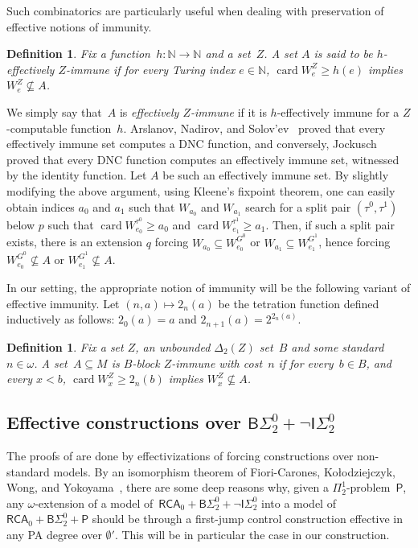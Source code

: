 \documentclass{article}
\newcommand{\Psf}{\mathsf{P}}
\newcommand{\ISig}{\mathsf{I}\Sigma^0}
\newcommand{\BSig}{\mathsf{B}\Sigma^0}
\newcommand{\RCA}[0]{\mathsf{RCA}}
\newcommand{\NN}[0]{\mathbb{N}}
\newcommand{\card}{\operatorname{card}}
\numberwithin{theorem}{section}
\newtheorem{definition}[theorem]{Definition}
\begin{document}
Such combinatorics are particularly useful when dealing with preservation of effective notions of immunity.

\begin{definition}
Fix a function~$h : \NN \to \NN$ and a set~$Z$.
A set $A$ is said to be \emph{$h$-effectively $Z$-immune} if for every Turing index $e \in \NN$, $\card W_e^Z \geq h(e)$ implies $W_e^Z \not \subseteq A$.
\end{definition}

We simply say that~$A$ is \emph{effectively $Z$-immune} if it is $h$-effectively immune for a $Z$-computable function~$h$.
Arslanov, Nadirov, and Solov'ev~\cite{arslanov1977completeness} proved that every effectively immune set computes a DNC function, and conversely, Jockusch~\cite{jockusch1989fpf} proved that every DNC function computes an effectively immune set, witnessed by the identity function. Let $A$ be such an effectively immune set. By slightly modifying the above argument, using Kleene's fixpoint theorem, one can easily obtain indices $a_0$ and $a_1$ such that $W_{a_0}$ and $W_{a_1}$ search for a split pair  $(\tau^0, \tau^1)$ below $p$ such that $\card W^{\tau^0}_{e_0} \geq a_0$ and $\card W^{\tau^1}_{e_1} \geq a_1$. Then, if such a split pair exists, there is an extension $q$ forcing $W_{a_0} \subseteq W^{G^0}_{e_0}$ or $W_{a_1} \subseteq W^{G^1}_{e_1}$, hence forcing $W^{G^0}_{e_0} \not \subseteq A$ or $W^{G^1}_{e_1} \not \subseteq A$.

In our setting, the appropriate notion of immunity will be the following variant of effective immunity. Let $(n, a) \mapsto 2_n(a)$ be the tetration function defined inductively as follows: $2_0(a) = a$ and $2_{n+1}(a) = 2^{2_n(a)}$. 

\begin{definition}
Fix a set $Z$, an unbounded $\Delta_2(Z)$ set~$B$ and some standard $n \in \omega$. A set~$A \subseteq M$ is \emph{$B$-block $Z$-immune with cost~$n$} if for every~$b \in B$, and every $x < b$, $\card W^Z_x \geq 2_n(b)$ implies $W^Z_x \not \subseteq A$.
\end{definition}

\subsection{Effective constructions over $\BSig_2 + \neg \ISig_2$}

The proofs of  are done by effectivizations of forcing constructions over non-standard models. By an isomorphism theorem of Fiori-Carones, Kołodziejczyk, Wong, and Yokoyama~\cite{fiori2021isomorphism}, there are some deep reasons why, given a $\Pi^1_2$-problem~$\Psf$, any $\omega$-extension of a model of~$\RCA_0 + \BSig_2 + \neg \ISig_2$ into a model of~$\RCA_0 + \BSig_2 + \Psf$ should be through a first-jump control construction effective in any PA degree over $\emptyset'$. This will be in particular the case in our construction.
\end{document}
